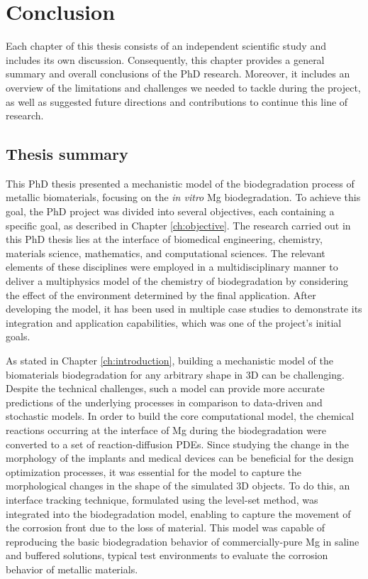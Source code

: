 \chapter{Conclusion}\label{ch:conclusion}


Each chapter of this thesis consists of an independent scientific study and includes its own discussion. Consequently, this chapter provides a general summary and overall conclusions of the PhD research. Moreover, it includes an overview of the limitations and challenges we needed to tackle during the project, as well as suggested future directions and contributions to continue this line of research.

\section{Thesis summary} \label{sec:conclusion_summary}


This PhD thesis presented a mechanistic model of the biodegradation process of metallic biomaterials, focusing on the \textit{in vitro} Mg biodegradation. To achieve this goal, the PhD project was divided into several objectives, each containing a specific goal, as described in Chapter \ref{ch:objective}. The research carried out in this PhD thesis lies at the interface of biomedical engineering, chemistry, materials science, mathematics, and computational sciences. The relevant elements of these disciplines were employed in a multidisciplinary manner to deliver a multiphysics model of the chemistry of biodegradation by considering the effect of the environment determined by the final application. After developing the model, it has been used in multiple case studies to demonstrate its integration and application capabilities, which was one of the project's initial goals.

As stated in Chapter \ref{ch:introduction}, building a mechanistic model of the biomaterials biodegradation for any arbitrary shape in 3D can be challenging. Despite the technical challenges, such a model can provide more accurate predictions of the underlying processes in comparison to data-driven and stochastic models. In order to build the core computational model, the chemical reactions occurring at the interface of Mg during the biodegradation were converted to a set of reaction-diffusion \gls{PDE}s. Since studying the change in the morphology of the implants and medical devices can be beneficial for the design optimization processes, it was essential for the model to capture the morphological changes in the shape of the simulated 3D objects. To do this, an interface tracking technique, formulated using the level-set method, was integrated into the biodegradation model, enabling to capture the movement of the corrosion front due to the loss of material. This model was capable of reproducing the basic biodegradation behavior of commercially-pure Mg in saline and buffered solutions, typical test environments to evaluate the corrosion behavior of metallic materials.

